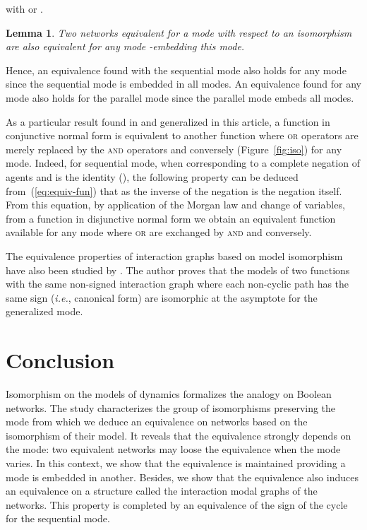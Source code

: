 \documentclass[12pt]{elsarticle}
\newtheorem{lemma}{Lemma}
\newcommand{\abbrev}[1]{#1, \relax}
\newcommand{\ie}[0]{\abbrev{\textit{i.e.}}}
\begin{document}
\noindent
  with  or .

\begin{lemma}
\label{lem:fun-equivalent}
 Two networks equivalent for a mode with respect to an isomorphism  are also equivalent for any mode -embedding this mode.
\end{lemma}
Hence, an equivalence found with the sequential mode also holds for any mode since the sequential mode is embedded in all modes. An equivalence found for any mode also holds for the parallel mode since the parallel mode embeds all modes.

As a particular result found in \cite{Jarrah2010} and generalized in this article, a function in conjunctive normal form is equivalent to another function where \textsc{or} operators are merely replaced by the \textsc{and} operators and conversely (Figure~\ref{fig:iso}) for any mode. Indeed, 
for sequential mode, when  corresponding to a complete negation of agents and  is the identity (), the following property can be deduced from~(\ref{eq:equiv-fun}) that  as the inverse of the negation is the negation itself. From this equation, by application of the Morgan law and change of variables, from a function in disjunctive normal form  we obtain an equivalent function  available for any mode where \textsc{or} are exchanged by \textsc{and} and conversely. 

 The equivalence properties of interaction graphs based on model isomorphism have also been studied by \cite{Noual2012}. The author proves that the models of two functions with the same non-signed interaction graph where each non-cyclic path has the same sign (\ie canonical form) are isomorphic at the asymptote for the generalized mode.

\section{Conclusion}
Isomorphism on the models of dynamics formalizes the analogy on  Boolean networks. 
The study characterizes the group of isomorphisms preserving the mode from which we deduce an equivalence on networks based on the isomorphism of their model. It reveals that the equivalence strongly depends on the mode: two equivalent networks may loose the equivalence when the mode varies. In this context, we show that the equivalence is maintained providing a mode is embedded in another. Besides, we show that the equivalence also induces an equivalence on a structure called the interaction modal graphs of the networks. This property is completed by an equivalence of the sign of the cycle for the sequential mode.
\end{document}
